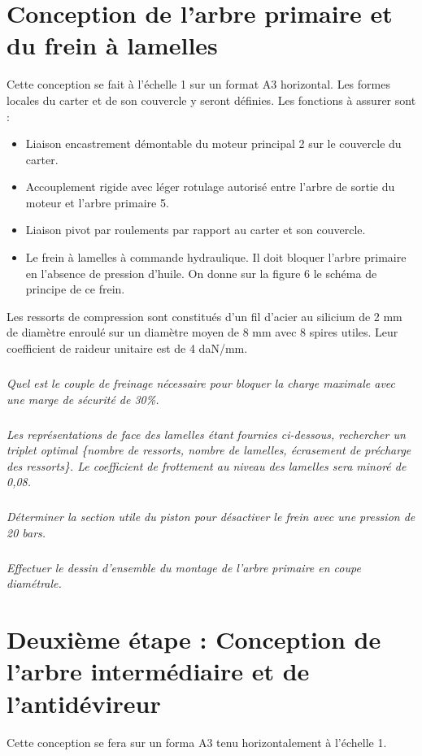 \documentclass[10pt]{article}
\begin{document}
\section{Conception de l'arbre primaire et du frein à lamelles}
Cette conception se fait à l'échelle 1 sur un format A3 horizontal. Les formes locales du carter et de son couvercle y seront définies. Les fonctions à assurer sont : 
\begin{itemize}
\item Liaison encastrement démontable du moteur principal 2 sur le couvercle du carter.
\item Accouplement rigide avec léger rotulage autorisé entre l'arbre de sortie du moteur et l'arbre primaire 5. 
\item Liaison pivot par roulements par rapport au carter et son couvercle.
\item Le frein à lamelles à commande hydraulique. Il doit bloquer l'arbre primaire en l'absence de pression d'huile. On donne sur la figure 6 le schéma de principe de ce frein.
\end{itemize}

Les ressorts de compression sont constitués d'un fil d'acier au silicium de 2 mm de diamètre enroulé sur un diamètre moyen de 8 mm avec 8 spires utiles. Leur coefficient de raideur unitaire est de 4 daN/mm.

\subparagraph{}
\textit{Quel est le couple de freinage nécessaire pour bloquer la charge maximale avec une marge de sécurité de 30\%.}

\subparagraph{}
\textit{Les représentations de face des lamelles étant fournies ci-dessous, rechercher un triplet optimal \{nombre de ressorts, nombre de lamelles, écrasement de précharge des ressorts\}. Le coefficient de frottement au niveau des lamelles sera minoré de 0,08.}

\subparagraph{}
\textit{Déterminer la section utile du piston pour désactiver le frein avec une pression de 20 bars.}

\subparagraph{}
\textit{Effectuer le dessin d'ensemble du montage de l'arbre primaire en coupe diamétrale.}


\section{Deuxième étape : Conception de l'arbre intermédiaire et de l'antidévireur}

Cette conception se fera sur un forma A3 tenu horizontalement à l'échelle 1.
\end{document}
